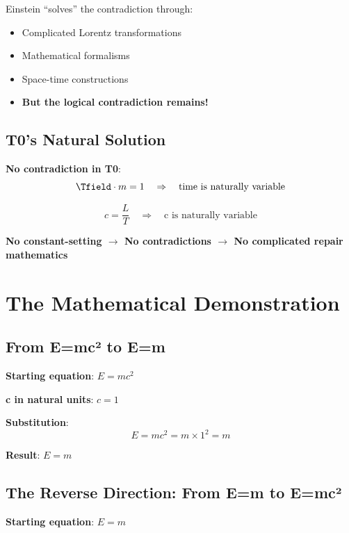 	Einstein ``solves'' the contradiction through:
	\begin{itemize}
		\item Complicated Lorentz transformations
		\item Mathematical formalisms
		\item Space-time constructions
		\item \textbf{But the logical contradiction remains!}
	\end{itemize}
	
	\subsection{T0's Natural Solution}
	
	\textbf{No contradiction in T0}:
	\begin{equation}
		\Tfield \cdot m = 1 \quad \Rightarrow \quad \text{time is naturally variable}
	\end{equation}
	
	\begin{equation}
		c = \frac{L}{T} \quad \Rightarrow \quad \text{c is naturally variable}
	\end{equation}
	
	\textbf{No constant-setting $\rightarrow$ No contradictions $\rightarrow$ No complicated repair mathematics}
	
	\section{The Mathematical Demonstration}
	
	\subsection{From E=mc² to E=m}
	
	\textbf{Starting equation}: $E = mc^2$
	
	\textbf{c in natural units}: $c = 1$
	
	\textbf{Substitution}:
	\begin{equation}
		E = mc^2 = m \times 1^2 = m
	\end{equation}
	
	\textbf{Result}: $E = m$
	
	\subsection{The Reverse Direction: From E=m to E=mc²}
	
	\textbf{Starting equation}: $E = m$
	
